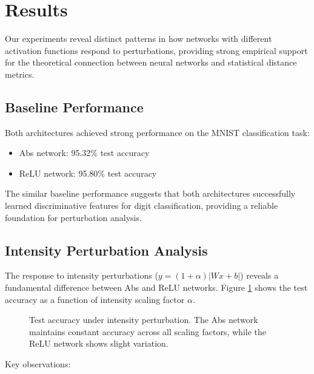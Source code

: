 \section{Results}

Our experiments reveal distinct patterns in how networks with different activation functions respond to perturbations, providing strong empirical support for the theoretical connection between neural networks and statistical distance metrics.

\subsection{Baseline Performance}

Both architectures achieved strong performance on the MNIST classification task:

\begin{itemize}
    \item Abs network: 95.32\% test accuracy
    \item ReLU network: 95.80\% test accuracy
\end{itemize}

The similar baseline performance suggests that both architectures successfully learned discriminative features for digit classification, providing a reliable foundation for perturbation analysis.

\subsection{Intensity Perturbation Analysis}

The response to intensity perturbations ($y = (1 + \alpha)|Wx + b|$) reveals a fundamental difference between Abs and ReLU networks. Figure \ref{fig:intensity} shows the test accuracy as a function of intensity scaling factor $\alpha$.

\begin{figure}[h]
\centering
\caption{Test accuracy under intensity perturbation. The Abs network maintains constant accuracy across all scaling factors, while the ReLU network shows slight variation.}
\label{fig:intensity}
\end{figure}

Key observations:

